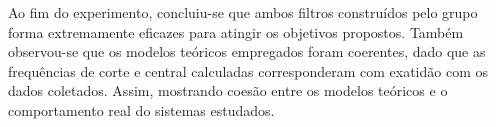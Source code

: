 Ao fim do experimento, concluiu-se que ambos filtros construídos pelo grupo forma extremamente eficazes para atingir os objetivos propostos. Também observou-se que os modelos teóricos empregados foram coerentes, dado que as frequências de corte e central calculadas corresponderam com exatidão com os dados coletados. Assim, mostrando coesão entre os modelos teóricos e o comportamento real do sistemas estudados.

